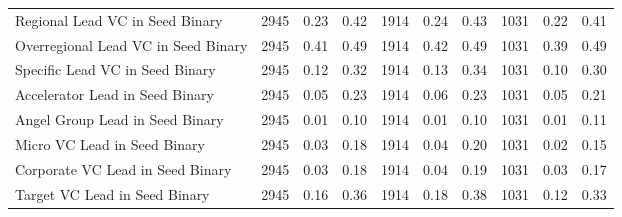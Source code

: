 {\begin{table}[!h]
{\begin{tabular}[t]{lrrrrrrrrr}
Regional Lead VC in Seed Binary & 2945 & 0.23 & 0.42 & 1914 & 0.24 & 0.43 & 1031 & 0.22 & 0.41\\
Overregional Lead VC in Seed Binary & 2945 & 0.41 & 0.49 & 1914 & 0.42 & 0.49 & 1031 & 0.39 & 0.49\\
Specific Lead VC in Seed Binary & 2945 & 0.12 & 0.32 & 1914 & 0.13 & 0.34 & 1031 & 0.10 & 0.30\\
Accelerator Lead in Seed Binary & 2945 & 0.05 & 0.23 & 1914 & 0.06 & 0.23 & 1031 & 0.05 & 0.21\\
\addlinespace
Angel Group Lead in Seed Binary & 2945 & 0.01 & 0.10 & 1914 & 0.01 & 0.10 & 1031 & 0.01 & 0.11\\
Micro VC Lead in Seed Binary & 2945 & 0.03 & 0.18 & 1914 & 0.04 & 0.20 & 1031 & 0.02 & 0.15\\
Corporate VC Lead in Seed Binary & 2945 & 0.03 & 0.18 & 1914 & 0.04 & 0.19 & 1031 & 0.03 & 0.17\\
Target VC Lead in Seed Binary & 2945 & 0.16 & 0.36 & 1914 & 0.18 & 0.38 & 1031 & 0.12 & 0.33\\
\bottomrule
\end{tabular}}
\end{table}
}
